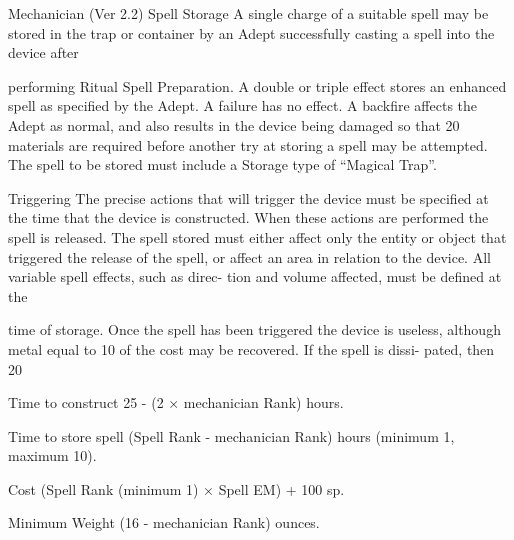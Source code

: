 \begin{Chapter}{Mechanician (Ver 2.2)}
Spell  Storage  A  single  charge  of  a  suitable  spell 
may be stored in the trap or container by an Adept 
successfully  casting  a  spell  into  the  device  after 

performing  Ritual  Spell  Preparation.  A  double  or 
triple  effect  stores  an  enhanced  spell  as  specified 
by  the  Adept.  A  failure  has  no  effect.  A  backfire 
affects the Adept as normal, and also results in the 
device  being damaged  so  that 20%
materials are required before another try at storing 
a  spell  may  be  attempted.  The  spell  to  be  stored 
must include a Storage type of “Magical Trap”. 

Triggering The precise actions that will trigger the 
device must be specified at the time that the device 
is  constructed.  When  these  actions  are  performed 
the  spell  is  released.  The  spell  stored  must  either 
affect  only  the  entity  or  object  that  triggered  the 
release of the spell, or affect an area in relation to 
the device. All variable spell effects, such as direc-
tion  and  volume  affected,  must  be  defined  at  the 

time  of  storage.  Once  the  spell  has  been  triggered 
the device is useless, although metal equal to 10%
of  the  cost  may  be  recovered.  If  the  spell  is  dissi-
pated, then 20%

Time  to  construct  25  -  (2  ×  mechanician  Rank) 
hours. 

Time  to  store  spell  (Spell  Rank  -  mechanician 
Rank) hours (minimum 1, maximum 10). 

Cost (Spell Rank (minimum 1) × Spell EM) + 100 
sp. 

Minimum  Weight  (16  -  mechanician  Rank) 
ounces. 
\end{Chapter}
